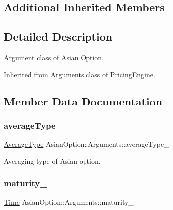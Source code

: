 \subsection*{Additional Inherited Members}


\subsection{Detailed Description}
Argument class of Asian Option. 

Inherited from \hyperlink{class_asian_option_1_1_arguments}{Arguments} class of \hyperlink{class_pricing_engine}{Pricing\+Engine}. 

\subsection{Member Data Documentation}
\hypertarget{class_asian_option_1_1_arguments_aa93577b436b362136035ed3f6fc742bf}{}\label{class_asian_option_1_1_arguments_aa93577b436b362136035ed3f6fc742bf} 
\subsubsection{\texorpdfstring{average\+Type\+\_\+}{averageType\_}}
{\footnotesize\ttfamily \hyperlink{class_asian_option_add7292791bf85820ff9fdbfd4407f3b9}{Average\+Type} Asian\+Option\+::\+Arguments\+::average\+Type\+\_\+}



Averaging type of Asian option. 

\hypertarget{class_asian_option_1_1_arguments_ad39a2dee07ec9ec77cb64cb75e44a056}{}\label{class_asian_option_1_1_arguments_ad39a2dee07ec9ec77cb64cb75e44a056} 
\subsubsection{\texorpdfstring{maturity\+\_\+}{maturity\_}}
{\footnotesize\ttfamily \hyperlink{_name_def_8h_ac2d3e0ba793497bcca555c7c2cf64ff3}{Time} Asian\+Option\+::\+Arguments\+::maturity\+\_\+}



